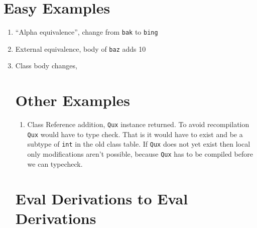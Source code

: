 \documentclass[12pt]{article}
\begin{document}

\lstset{
  language=Java,
  basicstyle=\ttfamily
}

\section{Easy Examples}

\begin{enumerate}
  \item ``Alpha equivalence'', change from \texttt{bak} to \texttt{bing}

    

  \item External equivalence, body of \texttt{baz} adds 10

    

  \item Class body changes,

    

\newpage

\section{Other Examples}

\begin{enumerate}
  \item Class Reference addition, \texttt{Qux} instance returned. To avoid recompilation \texttt{Qux} would have to type check. That is it would have to exist and be a subtype of \texttt{int} in the old class table. If \texttt{Qux} does not yet exist then local only modifications aren't possible, because \texttt{Qux} has to be compiled before we can typecheck.

    
\end{enumerate}

\section{Eval Derivations to Eval Derivations}


\end{enumerate}
\end{document}
